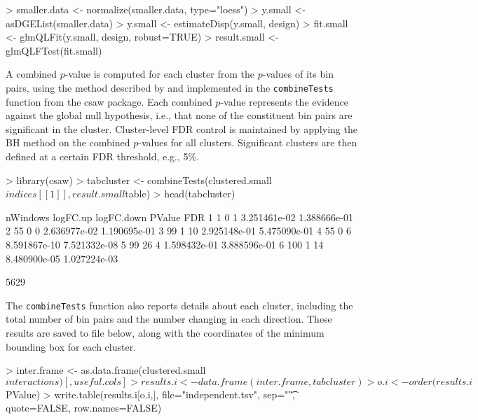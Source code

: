 \documentclass[12pt]{report}
\renewenvironment{Schunk}{\vspace{0pt}}{\vspace{0pt}}
\newcommand{\csaw}{csaw}
\newcommand{\code}[1]{{\small\texttt{#1}}}
\begin{document}
\begin{Schunk}
\begin{Sinput}
> smaller.data <- normalize(smaller.data, type="loess")
> y.small <- asDGEList(smaller.data)
> y.small <- estimateDisp(y.small, design)
> fit.small <- glmQLFit(y.small, design, robust=TRUE)
> result.small <- glmQLFTest(fit.small)
\end{Sinput}
\end{Schunk}

A combined $p$-value is computed for each cluster from the $p$-values of its bin pairs, using the method described by \cite{simes1986} and implemented in the \code{combineTests} function from the \csaw{} package.
Each combined $p$-value represents the evidence against the global null hypothesis, i.e., that none of the constituent bin pairs are significant in the cluster.
Cluster-level FDR control is maintained by applying the BH method on the combined $p$-values for all clusters.
Significant clusters are then defined at a certain FDR threshold, e.g., 5\%.

\begin{Schunk}
\begin{Sinput}
> library(csaw)
> tabcluster <- combineTests(clustered.small$indices[[1]], result.small$table)
> head(tabcluster)
\end{Sinput}
\begin{Soutput}
  nWindows logFC.up logFC.down       PValue          FDR
1        1        0          1 3.251461e-02 1.388666e-01
2       55        0          0 2.636977e-02 1.190695e-01
3       99        1         10 2.925148e-01 5.475090e-01
4       55        0          6 8.591867e-10 7.521332e-08
5       99       26          4 1.598432e-01 3.888596e-01
6      100        1         14 8.480900e-05 1.027224e-03
\end{Soutput}
\begin{Soutput}
[1] 5629
\end{Soutput}
\end{Schunk}

The \code{combineTests} function also reports details about each cluster, including the total number of bin pairs and the number changing in each direction.
These results are saved to file below, along with the coordinates of the minimum bounding box for each cluster.

\begin{Schunk}
\begin{Sinput}
> inter.frame <- as.data.frame(clustered.small$interactions)[,useful.cols]
> results.i <- data.frame(inter.frame, tabcluster)
> o.i <- order(results.i$PValue)
> write.table(results.i[o.i,], file="independent.tsv", sep="\t", quote=FALSE, row.names=FALSE)
\end{Sinput}
\end{Schunk}
\end{document}
